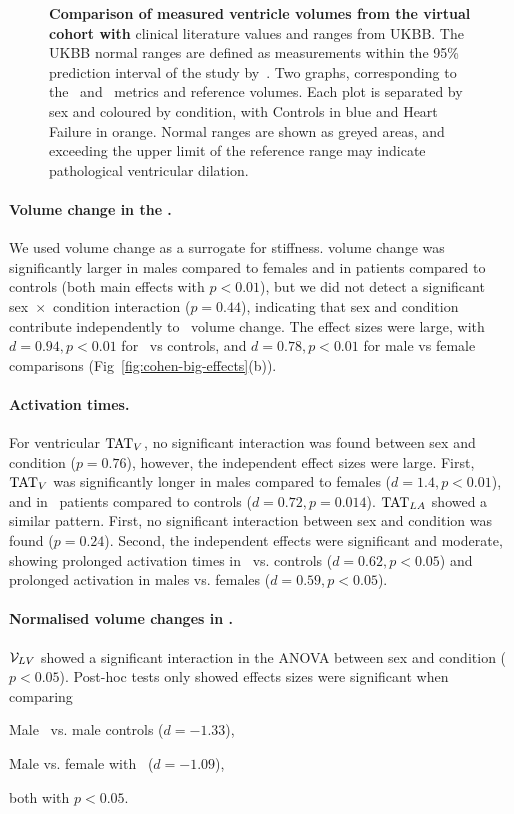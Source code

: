 \begin{figure}[hbpt]
    \caption{
        \textbf{Comparison of measured ventricle volumes from the virtual cohort with}
        clinical literature values and ranges from UKBB.
        The UKBB normal ranges are defined as measurements within the 95\% prediction interval
        of the study by~\cite{petersen-2017-reference}. 
        Two graphs, corresponding to the \LV\ and \RV\ metrics and reference volumes. 
        Each plot is separated by sex and coloured by condition, with Controls in blue and 
        Heart Failure in orange.
        Normal ranges are shown as greyed areas, and exceeding the upper limit of the
        reference range may indicate pathological ventricular dilation. 
    }
    \label{fig:validation-volumes}
\end{figure}
\paragraph{Volume change in the \LV.}
We used volume change as a surrogate for stiffness. 
\LV volume change was significantly larger in males compared to females and in 
\HF patients compared to controls (both main effects with $p<0.01$), 
but we did not detect a significant sex~$\times$~condition interaction ($p=0.44$), 
indicating that sex and condition contribute independently to \LV\ volume change. 
The effect sizes were large, with $d=0.94, p<0.01$ for \HF\ vs controls, 
and $d=0.78, p<0.01$ for male vs female comparisons (Fig~\ref{fig:cohen-big-effects}(b)).

\paragraph{Activation times.}
For ventricular $\mathrm{TAT}_{V}$, no significant interaction was found between sex and condition ($p=0.76$), 
however, the independent effect sizes were large. 
First, $\mathrm{TAT}_{V}$ was significantly longer in males compared to females ($d=1.4, p<0.01$), 
and in \HF\ patients compared to controls ($d=0.72, p=0.014$).
$\mathrm{TAT}_{LA}$ showed a similar pattern. First, no significant interaction between sex and condition 
was found ($p=0.24$). Second, the independent effects were significant and moderate, showing 
prolonged activation times in \HF\ vs. controls ($d=0.62, p<0.05$) and prolonged activation 
in males vs. females ($d=0.59, p<0.05$). 

\paragraph{Normalised volume changes in \LV.}
$\mathcal{V}_{LV}$ showed a significant interaction in the ANOVA between sex and condition ($p<0.05$).
Post-hoc tests only showed effects sizes were significant when comparing
\begin{itemize*}
    \item[] Male \HF\ vs. male controls ($d=-1.33$),
    \item[] Male vs. female with \HF\ ($d=-1.09$),
\end{itemize*} 
both with $p<0.05$.

